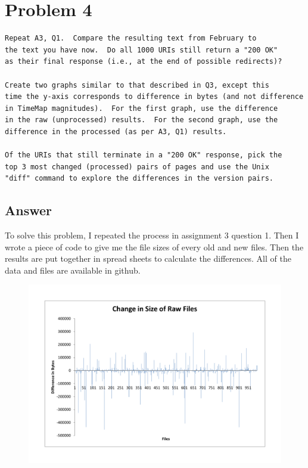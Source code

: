 \documentclass[12pt]{article}
\begin{document}
\section*{Problem 4}
\begin{verbatim}
Repeat A3, Q1.  Compare the resulting text from February to 
the text you have now.  Do all 1000 URIs still return a "200 OK" 
as their final response (i.e., at the end of possible redirects)?

Create two graphs similar to that described in Q3, except this 
time the y-axis corresponds to difference in bytes (and not difference
in TimeMap magnitudes).  For the first graph, use the difference
in the raw (unprocessed) results.  For the second graph, use the 
difference in the processed (as per A3, Q1) results.

Of the URIs that still terminate in a "200 OK" response, pick the
top 3 most changed (processed) pairs of pages and use the Unix
"diff" command to explore the differences in the version pairs.
\end{verbatim}

\subsection*{Answer}
To solve this problem, I repeated the process in assignment 3 question 1. Then I wrote a piece of code to give me the file sizes of every old and new files. Then the results are put together in spread sheets to calculate the differences. All of the data and files are available in github.

\begin{figure}[h!]
\centering
\includegraphics[width=6.5in]{RawDifference.pdf}
\end{figure}
\end{document}
